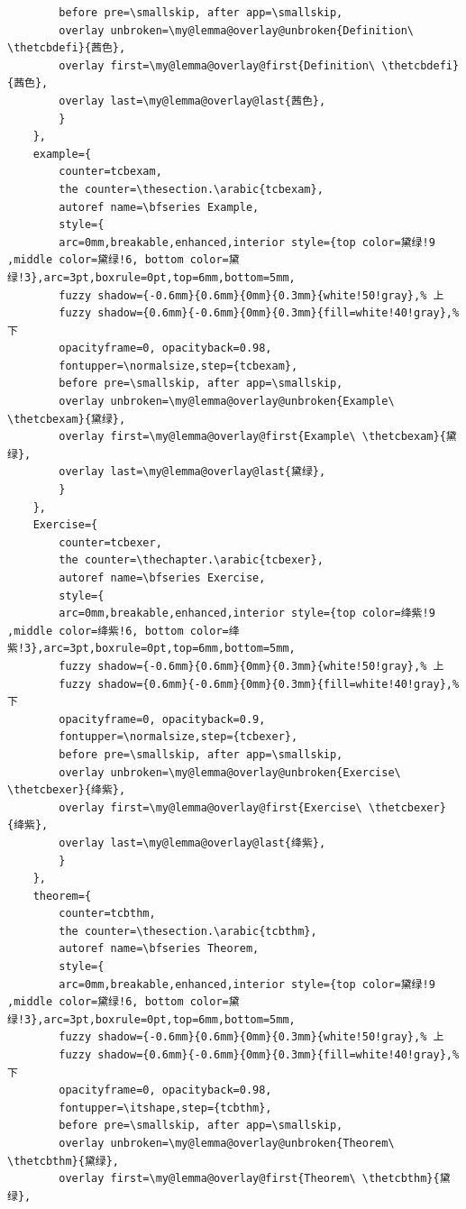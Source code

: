 \documentclass[lang=cn,zihao=-4,a4paper,fontset=windows]{beautybook}
\begin{document}
\begin{lstlisting}
        before pre=\smallskip, after app=\smallskip,
        overlay unbroken=\my@lemma@overlay@unbroken{Definition\ \thetcbdefi}{茜色},
        overlay first=\my@lemma@overlay@first{Definition\ \thetcbdefi}{茜色},
        overlay last=\my@lemma@overlay@last{茜色},
        }
    },
    example={
        counter=tcbexam,
        the counter=\thesection.\arabic{tcbexam},
        autoref name=\bfseries Example,
        style={
        arc=0mm,breakable,enhanced,interior style={top color=黛绿!9 ,middle color=黛绿!6, bottom color=黛绿!3},arc=3pt,boxrule=0pt,top=6mm,bottom=5mm,
        fuzzy shadow={-0.6mm}{0.6mm}{0mm}{0.3mm}{white!50!gray},% 上
        fuzzy shadow={0.6mm}{-0.6mm}{0mm}{0.3mm}{fill=white!40!gray},%下
        opacityframe=0, opacityback=0.98,
        fontupper=\normalsize,step={tcbexam},
        before pre=\smallskip, after app=\smallskip,
        overlay unbroken=\my@lemma@overlay@unbroken{Example\ \thetcbexam}{黛绿},
        overlay first=\my@lemma@overlay@first{Example\ \thetcbexam}{黛绿},
        overlay last=\my@lemma@overlay@last{黛绿},
        }
    },
    Exercise={
        counter=tcbexer,
        the counter=\thechapter.\arabic{tcbexer},
        autoref name=\bfseries Exercise,
        style={
        arc=0mm,breakable,enhanced,interior style={top color=绛紫!9 ,middle color=绛紫!6, bottom color=绛紫!3},arc=3pt,boxrule=0pt,top=6mm,bottom=5mm,
        fuzzy shadow={-0.6mm}{0.6mm}{0mm}{0.3mm}{white!50!gray},% 上
        fuzzy shadow={0.6mm}{-0.6mm}{0mm}{0.3mm}{fill=white!40!gray},%下
        opacityframe=0, opacityback=0.9,
        fontupper=\normalsize,step={tcbexer},
        before pre=\smallskip, after app=\smallskip,
        overlay unbroken=\my@lemma@overlay@unbroken{Exercise\ \thetcbexer}{绛紫},
        overlay first=\my@lemma@overlay@first{Exercise\ \thetcbexer}{绛紫},
        overlay last=\my@lemma@overlay@last{绛紫},
        }
    },
    theorem={
        counter=tcbthm,
        the counter=\thesection.\arabic{tcbthm},
        autoref name=\bfseries Theorem,
        style={
        arc=0mm,breakable,enhanced,interior style={top color=黛绿!9 ,middle color=黛绿!6, bottom color=黛绿!3},arc=3pt,boxrule=0pt,top=6mm,bottom=5mm,
        fuzzy shadow={-0.6mm}{0.6mm}{0mm}{0.3mm}{white!50!gray},% 上
        fuzzy shadow={0.6mm}{-0.6mm}{0mm}{0.3mm}{fill=white!40!gray},%下
        opacityframe=0, opacityback=0.98,
        fontupper=\itshape,step={tcbthm},
        before pre=\smallskip, after app=\smallskip,
        overlay unbroken=\my@lemma@overlay@unbroken{Theorem\ \thetcbthm}{黛绿},
        overlay first=\my@lemma@overlay@first{Theorem\ \thetcbthm}{黛绿},

\end{lstlisting}
\end{document}
